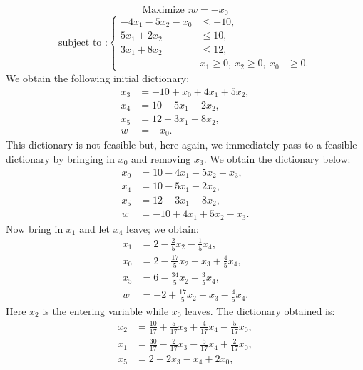 \begin{example}
    \[
        \text{Maximize :} w = -x_0
    \]
    \[
        \text{subject to :}
        \left\{
        \begin{aligned}
        -4x_1 - 5x_2 - x_0 &\leqslant -10,\\
        5x_1 + 2x_2 &\leqslant 10,\\
        3x_1 + 8x_2 &\leqslant 12,\\&
        x_1 \ge 0,\ x_2 \ge 0,\ x_0 &\ge 0.
        \end{aligned}
        \right.
    \]
    We obtain the following initial dictionary:
    \[
        \begin{aligned}
        x_3 &= -10 + x_0 + 4x_1 + 5x_2,\\
        x_4 &= 10 - 5x_1 - 2x_2,\\
        x_5 &= 12 - 3x_1 - 8x_2,\\
        \hline
        w &= -x_0.
        \end{aligned}
    \]
    This dictionary is not feasible but, here again, we immediately pass to a feasible dictionary by bringing in \(x_0\) and removing \(x_3\). We obtain the dictionary below:
    \[
        \begin{aligned}
        x_0 &= 10 - 4x_1 - 5x_2 + x_3,\\
        x_4 &= 10 - 5x_1 - 2x_2,\\
        x_5 &= 12 - 3x_1 - 8x_2,\\
        \hline
        w &= -10 + 4x_1 + 5x_2 - x_3.
        \end{aligned}
    \]
    Now bring in \(x_1\) and let \(x_4\) leave; we obtain:
    \[
        \begin{aligned}
        x_1 &= 2 - \tfrac{2}{5}x_2 - \tfrac{1}{5}x_4,\\
        x_0 &= 2 - \tfrac{17}{5}x_2 + x_3 + \tfrac{4}{5}x_4,\\
        x_5 &= 6 - \tfrac{34}{5}x_2 + \tfrac{3}{5}x_4,\\
        \hline
        w &= -2 + \tfrac{17}{5}x_2 - x_3 - \tfrac{4}{5}x_4.
        \end{aligned}
    \]
    Here \(x_2\) is the entering variable while \(x_0\) leaves. The dictionary obtained is:
    \[
        \begin{aligned}
        x_2 &= \tfrac{10}{17} + \tfrac{5}{17}x_3 + \tfrac{4}{17}x_4 - \tfrac{5}{17}x_0,\\
        x_1 &= \tfrac{30}{17} - \tfrac{2}{17}x_3 - \tfrac{5}{17}x_4 + \tfrac{2}{17}x_0,\\
        x_5 &= 2 - 2x_3 - x_4 + 2x_0,\\

\end{aligned}\]
\end{example}
